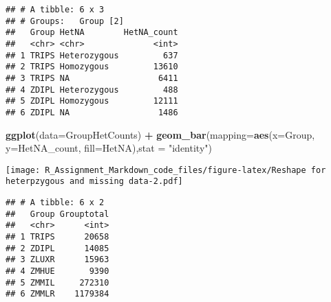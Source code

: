 \documentclass[]{article}
\newenvironment{Shaded}{\begin{snugshade}}{\end{snugshade}}
\newcommand{\KeywordTok}[1]{\textcolor[rgb]{0.13,0.29,0.53}{\textbf{#1}}}
\newcommand{\DataTypeTok}[1]{\textcolor[rgb]{0.13,0.29,0.53}{#1}}
\newcommand{\DecValTok}[1]{\textcolor[rgb]{0.00,0.00,0.81}{#1}}
\newcommand{\StringTok}[1]{\textcolor[rgb]{0.31,0.60,0.02}{#1}}
\newcommand{\CommentTok}[1]{\textcolor[rgb]{0.56,0.35,0.01}{\textit{#1}}}
\newcommand{\OperatorTok}[1]{\textcolor[rgb]{0.81,0.36,0.00}{\textbf{#1}}}
\newcommand{\NormalTok}[1]{#1}
\begin{document}
\begin{verbatim}
## # A tibble: 6 x 3
## # Groups:   Group [2]
##   Group HetNA        HetNA_count
##   <chr> <chr>              <int>
## 1 TRIPS Heterozygous         637
## 2 TRIPS Homozygous         13610
## 3 TRIPS NA                  6411
## 4 ZDIPL Heterozygous         488
## 5 ZDIPL Homozygous         12111
## 6 ZDIPL NA                  1486
\end{verbatim}

\begin{Shaded}
\begin{Highlighting}[]
\KeywordTok{ggplot}\NormalTok{(}\DataTypeTok{data=}\NormalTok{GroupHetCounts) }\OperatorTok{+}\StringTok{ }\KeywordTok{geom_bar}\NormalTok{(}\DataTypeTok{mapping=}\KeywordTok{aes}\NormalTok{(}\DataTypeTok{x=}\NormalTok{Group, }\DataTypeTok{y=}\NormalTok{HetNA_count, }\DataTypeTok{fill=}\NormalTok{HetNA),}\DataTypeTok{stat =} \StringTok{"identity"}\NormalTok{)}
\end{Highlighting}
\end{Shaded}

\texttt{[image: R\_Assignment\_Markdown\_code\_files/figure-latex/Reshape for heterpzygous and missing data-2.pdf]}

\begin{Shaded}
\end{Shaded}

\begin{verbatim}
## # A tibble: 6 x 2
##   Group Grouptotal
##   <chr>      <int>
## 1 TRIPS      20658
## 2 ZDIPL      14085
## 3 ZLUXR      15963
## 4 ZMHUE       9390
## 5 ZMMIL     272310
## 6 ZMMLR    1179384
\end{verbatim}
\end{document}
